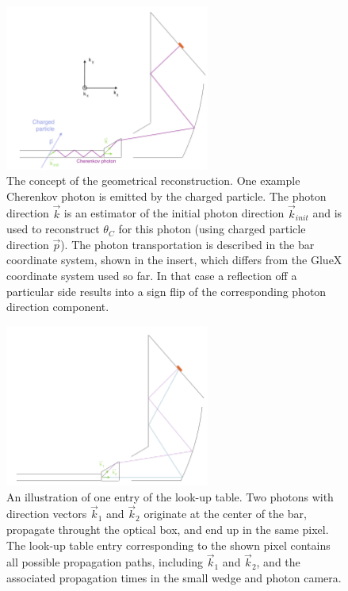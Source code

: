 \begin{figure}[!h]
\centering
\includegraphics[width=0.6\textwidth]{pics/lut3.png}
\caption{\label{pic:lut1}
The concept of the geometrical reconstruction. One example Cherenkov photon is emitted by the charged particle. The photon direction $\vec k$ is an estimator of the initial photon direction $\vec k_{init}$ and is used to reconstruct $\theta_{C}$ for this photon (using charged particle direction $\vec p$). The photon transportation is described in the bar coordinate system, shown in the insert, which differs from the GlueX coordinate system used so far. In that case a reflection off a particular side results into a sign flip of the corresponding photon direction component.
}
\end{figure}

\begin{figure}[!h]
\centering
\includegraphics[width=0.6\textwidth]{pics/lut1.png}
\caption{\label{pic:lut2}
An illustration of one entry of the look-up table. Two photons with direction vectors $\vec k_{1}$ and $\vec k_{2}$ originate at the center of the bar, propagate throught the optical box, and end up in the same pixel. The look-up table entry corresponding to the shown pixel contains all possible propagation paths, including $\vec k_{1}$ and $\vec k_{2}$, and the associated propagation times in the small wedge and photon camera.
}
\end{figure}

